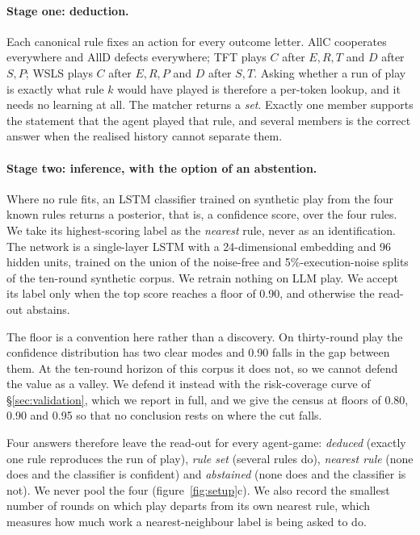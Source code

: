 \documentclass[11pt,a4paper]{article}
\begin{document}
\paragraph{Stage one: deduction.} Each canonical rule fixes an action for
every outcome letter. AllC cooperates everywhere and AllD defects everywhere;
TFT plays $C$ after $E,R,T$ and $D$ after $S,P$; WSLS plays $C$ after $E,R,P$
and $D$ after $S,T$. Asking whether a run of play is exactly what rule $k$ would
have played is therefore a per-token lookup, and it needs no learning at all.
The matcher returns a \emph{set}. Exactly one member supports the statement that
the agent played that rule, and several members is the correct answer when the
realised history cannot separate them.

\paragraph{Stage two: inference, with the option of an abstention.} Where no rule
fits, an LSTM classifier trained on synthetic play from the four known rules
returns a posterior, that is, a confidence score, over the four rules. We take
its highest-scoring label as
the \emph{nearest} rule, never as an identification. The network is a
single-layer LSTM with a 24-dimensional embedding and 96 hidden units, trained
on the union of the noise-free and 5\%-execution-noise splits of the ten-round
synthetic corpus. We retrain nothing on LLM play. We accept its label only when
the top score reaches a floor of 0.90, and otherwise the read-out abstains.

The floor is a convention here rather than a discovery. On thirty-round play
the confidence distribution has two clear modes and 0.90 falls in the gap
between them. At the ten-round horizon of this corpus it does not, so we
cannot defend the value as a valley. We defend it instead with the
risk-coverage curve of \S\ref{sec:validation}, which we report in full, and we
give the census at floors of 0.80, 0.90 and 0.95 so that no conclusion rests
on where the cut falls.

Four answers therefore leave the read-out for every agent-game:
\emph{deduced} (exactly one rule reproduces the run of play), \emph{rule set}
(several rules do), \emph{nearest rule} (none does and the classifier is
confident) and \emph{abstained} (none does and the classifier is not). We never
pool the four (figure~\ref{fig:setup}c). We also record the smallest number of
rounds on which play departs from its own nearest rule, which measures how much
work a nearest-neighbour label is being asked to do.
\end{document}
